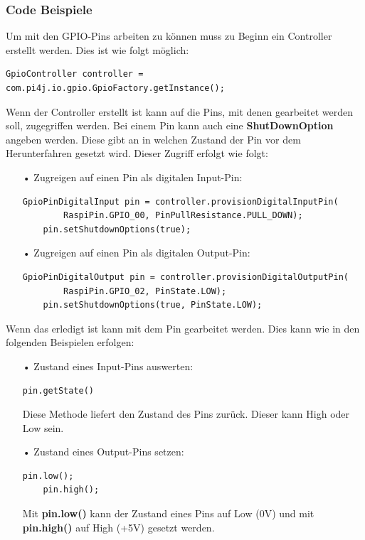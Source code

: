\subsubsection{Code Beispiele}
Um mit den \ac{GPIO}-Pins arbeiten zu können muss zu Beginn ein Controller erstellt werden. Dies ist wie folgt möglich:
\begin{lstlisting}[style=JavaStyle, caption=\ac{GPIO}-Controller erstellen]
	GpioController controller = com.pi4j.io.gpio.GpioFactory.getInstance();
\end{lstlisting}
Wenn der Controller erstellt ist kann auf die Pins, mit denen gearbeitet werden soll, zugegriffen werden. Bei einem Pin kann auch eine \textbf{ShutDownOption} angeben werden. Diese gibt an in welchen Zustand der Pin vor dem Herunterfahren gesetzt wird. Dieser Zugriff erfolgt wie folgt: 
\begin{itemize}
\item[•] Zugreigen auf einen Pin als digitalen Input-Pin:
\begin{lstlisting}[style=JavaStyle, caption=Zugriff auf einen Pin als Inpput]
	GpioPinDigitalInput pin = controller.provisionDigitalInputPin(
		RaspiPin.GPIO_00, PinPullResistance.PULL_DOWN);
	pin.setShutdownOptions(true);
\end{lstlisting}
\item[•] Zugreigen auf einen Pin als digitalen Output-Pin:
\begin{lstlisting}[style=JavaStyle, caption=Zugriff auf einen Pin als Output]
	GpioPinDigitalOutput pin = controller.provisionDigitalOutputPin(
		RaspiPin.GPIO_02, PinState.LOW);
	pin.setShutdownOptions(true, PinState.LOW);
\end{lstlisting}
\end{itemize}
Wenn das erledigt ist kann mit dem Pin gearbeitet werden. Dies kann wie in den folgenden Beispielen erfolgen:
\begin{itemize}
\item[•] Zustand eines Input-Pins auswerten: 
\begin{lstlisting}[style=JavaStyle, caption=Pinzustand abfragen]
	pin.getState()
\end{lstlisting}
Diese Methode liefert den Zustand des Pins zurück. Dieser kann High oder Low sein.

\newpage

\item[•] Zustand eines Output-Pins setzen:
\begin{lstlisting}[style=JavaStyle, caption=Pinzustand verändern]
	pin.low();	
	pin.high();
\end{lstlisting}
Mit \textbf{pin.low()} kann der Zustand eines Pins auf Low (0V) und mit \textbf{pin.high()} auf High (+5V) gesetzt werden. 
\end{itemize}


